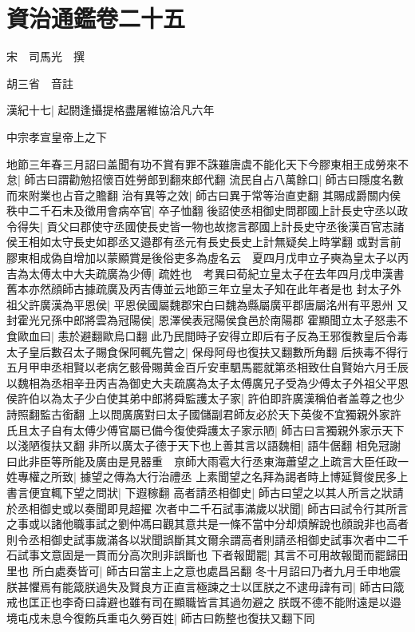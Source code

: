 \chapter{資治通鑑卷二十五}
宋　司馬光　撰

胡三省　音註

漢紀十七|{
	起閼逢攝提格盡屠維協洽凡六年}


中宗孝宣皇帝上之下

地節三年春三月詔曰盖聞有功不賞有罪不誅雖唐虞不能化天下今膠東相王成勞來不怠|{
	師古曰謂勸勉招懷百姓勞郎到翻來郎代翻}
流民自占八萬餘口|{
	師古曰隱度名數而來附業也占音之贍翻}
治有異等之效|{
	師古曰異于常等治直吏翻}
其賜成爵關内侯秩中二千石未及徵用會病卒官|{
	卒子恤翻}
後詔使丞相御史問郡國上計長史守丞以政令得失|{
	貢父曰郡使守丞國使長史皆一物也故揔言郡國上計長史守丞後漢百官志諸侯王相如太守長史如郡丞又邉郡有丞元有長史長史上計無疑矣上時掌翻}
或對言前膠東相成偽自增加以蒙顯賞是後俗吏多為虛名云　夏四月戊申立子奭為皇太子以丙吉為太傅太中大夫疏廣為少傅|{
	疏姓也　考異曰荀紀立皇太子在去年四月戊申漢書舊本亦然顔師古據疏廣及丙吉傳並云地節三年立皇太子知在此年者是也}
封太子外祖父許廣漢為平恩侯|{
	平恩侯國屬魏郡宋白曰魏為縣屬廣平郡唐屬洺州有平恩州}
又封霍光兄孫中郎將雲為冠陽侯|{
	恩澤侯表冠陽侯食邑於南陽郡}
霍顯聞立太子怒恚不食歐血曰|{
	恚於避翻歐烏口翻}
此乃民間時子安得立即后有子反為王邪復教皇后令毒太子皇后數召太子賜食保阿輒先嘗之|{
	保母阿母也復扶又翻數所角翻}
后挾毒不得行　五月甲申丞相賢以老病乞骸骨賜黄金百斤安車駟馬罷就第丞相致仕自賢始六月壬辰以魏相為丞相辛丑丙吉為御史大夫疏廣為太子太傅廣兄子受為少傅太子外祖父平恩侯許伯以為太子少白使其弟中郎將舜監護太子家|{
	許伯即許廣漢稱伯者盖尊之也少詩照翻監古銜翻}
上以問廣廣對曰太子國儲副君師友必於天下英俊不宜獨親外家許氏且太子自有太傅少傅官屬已備今復使舜護太子家示陋|{
	師古曰言獨親外家示天下以淺陋復扶又翻}
非所以廣太子德于天下也上善其言以語魏相|{
	語牛倨翻}
相免冠謝曰此非臣等所能及廣由是見器重　亰師大雨雹大行丞東海蕭望之上疏言大臣任政一姓專權之所致|{
	據望之傳為大行治禮丞}
上素聞望之名拜為謁者時上博延賢俊民多上書言便宜輒下望之問狀|{
	下遐稼翻}
高者請丞相御史|{
	師古曰望之以其人所言之狀請於丞相御史或以奏聞即見超擢}
次者中二千石試事滿歲以狀聞|{
	師古曰試令行其所言之事或以諸他職事試之劉仲馮曰觀其意共是一條不當中分却煩解說也顔說非也高者則令丞相御史試事歲滿各以狀聞誤斷其文爾余謂高者則請丞相御史試事次者中二千石試事文意固是一貫而分高次則非誤斷也}
下者報聞罷|{
	其言不可用故報聞而罷歸田里也}
所白處奏皆可|{
	師古曰當主上之意也處昌呂翻}
冬十月詔曰乃者九月壬申地震朕甚懼焉有能箴朕過失及賢良方正直言極諫之士以匡朕之不逮毋諱有司|{
	師古曰箴戒也匡正也李奇曰諱避也雖有司在顯職皆言其過勿避之}
朕既不德不能附遠是以邉境屯戍未息今復飭兵重屯久勞百姓|{
	師古曰飭整也復扶又翻下同}
